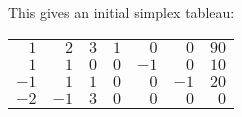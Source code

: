 \documentclass[11pt,letterpaper]{article}
\begin{document}
This gives an initial simplex tableau: \par
	\begin{table}[!ht]
	\centering
	\begin{tabular}{rrrrrr|r}
	$1$ & $2$ & $3$ & $1$ & $0$ & $0$ & $90$ \\
	$1$ & $1$ & $0$ & $0$ & $-1$ & $0$ & $10$ \\
	$-1$ & $1$ & $1$ & $0$ & $0$ & $-1$ & $20$ \\ \hline
	$-2$ & $-1$ & $3$ & $0$ & $0$ & $0$ & $0$ \\
	\end{tabular}
	\end{table}
\end{document}
